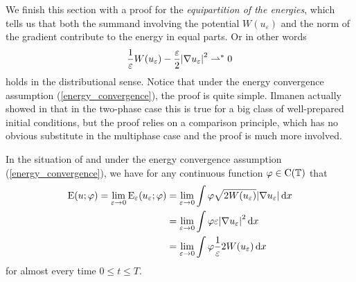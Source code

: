 We finish this section with a proof for the \emph{equipartition of the 
	energies}, which 
tells us that both the summand involving the potential $ W ( u_{ \varepsilon } 
) $ and the norm of the gradient contribute to the energy in equal parts. Or in 
other words
\begin{equation*}
	\frac{ 1 }{ \varepsilon } W ( u_{ \varepsilon } ) 
	- 
	\frac{ \varepsilon }{ 2 }
	\abs{ \nabla u_{ \varepsilon } }^{ 2 }
	\rightharpoonup^{ \ast }
	0 
\end{equation*}
holds in the distributional sense. Notice that under the 
energy convergence assumption (\ref{energy_convergence}), the proof is quite 
simple. Ilmanen actually showed in 
\cite{ilmanen_convergence_of_ac_to_brakkes_mcf} that in the two-phase case this 
is true
for a big class of well-prepared initial conditions, but the proof relies on a 
comparison principle, which has no obvious substitute in the multiphase case 
and the proof is much more involved.

\begin{lemma}
	\label{equipartition_of_energies}
	In the situation of  and under the energy 
	convergence assumption (\ref{energy_convergence}), we have 
	for any continuous function $ \varphi \in \operatorname{C} ( \operatorname{\mathbb{T}} ) $ 
	that
	\begin{align*}
		\operatorname{E} ( u ; \varphi )
		=
		\lim_{ \varepsilon \to 0 }
		\operatorname{E}_{ \varepsilon } ( u_{ \varepsilon } ; \varphi )
		& = 
		\lim_{ \varepsilon \to 0 }
		\int
		\varphi
		\sqrt{ 2 W ( u_{ \varepsilon } ) }
		\abs{ \nabla u_{ \varepsilon } }
		\dd{ x }
		\\
		& =
		\lim_{ \varepsilon \to 0 }
		\int
		\varphi
		\varepsilon
		\abs{ \nabla u_{ \varepsilon } }^{ 2 }
		\dd{ x}
		\\
		& =
		\lim_{ \varepsilon \to 0 }
		\int
		\varphi
		\frac{ 1 }{ \varepsilon }
		2 W ( u_{ \varepsilon } )
		\dd{ x }
	\end{align*}
	for almost every time $ 0 \leq t \leq T $.
\end{lemma}

